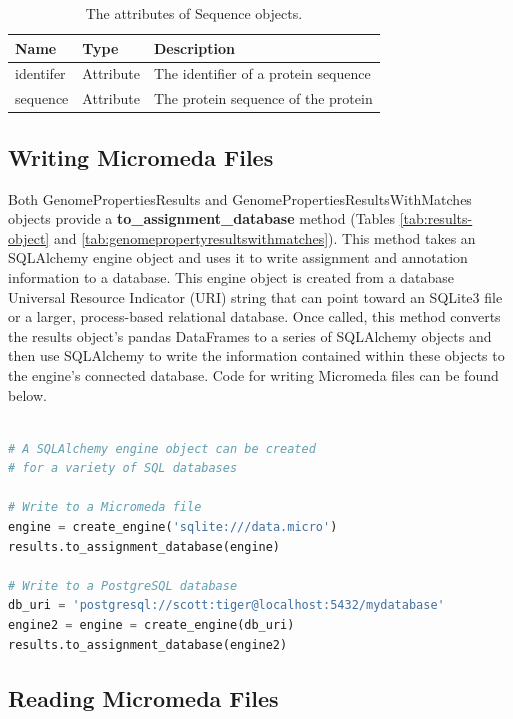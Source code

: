 \begin{table}[!ht]
\centering
\caption{The attributes of Sequence objects.}
\label{tab:sequenceobject}
\begin{tabular}{|p{2.7cm}|p{2cm}|p{10cm}|}
\hline
\textbf{Name} & \textbf{Type} & \textbf{Description} \\ \hline
identifer & Attribute & The identifier of a protein sequence \\ \hline
sequence & Attribute & The protein sequence of the protein \\ \hline
\end{tabular}
\end{table}


\subsection{Writing Micromeda Files}

Both GenomePropertiesResults and GenomePropertiesResultsWithMatches objects provide a \textbf{to\_assignment\_database} method (Tables \ref{tab:results-object} and \ref{tab:genomepropertyresultswithmatches}). This method takes an SQLAlchemy engine object and uses it to write assignment and annotation information to a database. This engine object is created from a database Universal Resource Indicator (URI) \cite{berners1998uniform} string that can point toward an SQLite3 file or a larger, process-based relational database. Once called, this method converts the results object's pandas DataFrames to a series of SQLAlchemy objects and then use SQLAlchemy to write the information contained within these objects to the engine's connected database. Code for writing Micromeda files can be found below.

\begin{lstlisting}[language=Python]  

# A SQLAlchemy engine object can be created
# for a variety of SQL databases

# Write to a Micromeda file
engine = create_engine('sqlite:///data.micro')
results.to_assignment_database(engine)

# Write to a PostgreSQL database
db_uri = 'postgresql://scott:tiger@localhost:5432/mydatabase'
engine2 = engine = create_engine(db_uri)
results.to_assignment_database(engine2)

\end{lstlisting}

\subsection{Reading Micromeda Files}

